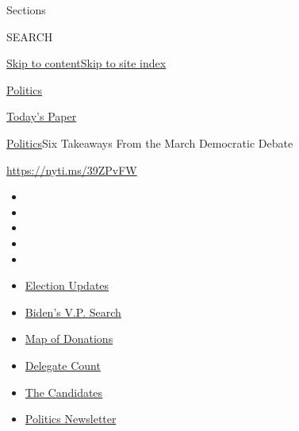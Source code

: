 Sections

SEARCH

\protect\hyperlink{site-content}{Skip to
content}\protect\hyperlink{site-index}{Skip to site index}

\href{https://www.nytimes.com/section/politics}{Politics}

\href{https://myaccount.nytimes.com/auth/login?response_type=cookie\&client_id=vi}{}

\href{https://www.nytimes.com/section/todayspaper}{Today's Paper}

\href{/section/politics}{Politics}\textbar{}Six Takeaways From the March
Democratic Debate

\url{https://nyti.ms/39ZPvFW}

\begin{itemize}
\item
\item
\item
\item
\item
\end{itemize}

\begin{itemize}
\item
  \href{https://www.nytimes.com/2020/07/31/us/elections/biden-vs-trump.html?action=click\&pgtype=Article\&state=default\&region=TOP_BANNER\&context=storylines_menu}{Election
  Updates}
\item
  \href{https://www.nytimes.com/article/biden-vice-president-2020.html?action=click\&pgtype=Article\&state=default\&region=TOP_BANNER\&context=storylines_menu}{Biden's
  V.P. Search}
\item
  \href{https://www.nytimes.com/interactive/2020/07/24/us/politics/trump-biden-campaign-donors.html?action=click\&pgtype=Article\&state=default\&region=TOP_BANNER\&context=storylines_menu}{Map
  of Donations}
\item
  \href{https://www.nytimes.com/interactive/2020/us/elections/delegate-count-primary-results.html?action=click\&pgtype=Article\&state=default\&region=TOP_BANNER\&context=storylines_menu}{Delegate
  Count}
\item
  \href{https://www.nytimes.com/interactive/2019/us/politics/2020-presidential-candidates.html?action=click\&pgtype=Article\&state=default\&region=TOP_BANNER\&context=storylines_menu}{The
  Candidates}
\item
  \href{https://www.nytimes.com/newsletters/politics?action=click\&pgtype=Article\&state=default\&region=TOP_BANNER\&context=storylines_menu}{Politics
  Newsletter}
\end{itemize}

